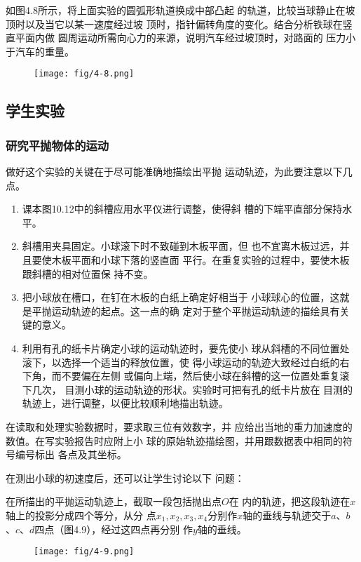 如图4.8所示，将上面实验的圆弧形轨道换成中部凸起
的轨道，比较当球静止在坡顶时以及当它以某一速度经过坡
顶时，指针偏转角度的变化。结合分析铁球在竖直平面内做
圆周运动所需向心力的来源，说明汽车经过坡顶时，对路面的
压力小于汽车的重量。


\begin{figure}[htp]
    \centering
    \texttt{[image: fig/4-8.png]}
    \caption{}
\end{figure}

\subsection{学生实验}
\subsubsection{研究平抛物体的运动}

做好这个实验的关键在于尽可能准确地描绘出平抛
运动轨迹，为此要注意以下几点。
\begin{enumerate}
\item 课本图10.12中的斜槽应用水平仪进行调整，使得斜
槽的下端平直部分保持水平。
\item 斜槽用夹具固定。小球滚下时不致碰到木板平面，但
也不宜离木板过远，并且要使木板平面和小球下落的竖直面
平行。在重复实验的过程中，要使木板跟斜槽的相对位置保
持不变。
\item 把小球放在槽口，在钉在木板的白纸上确定好相当于
小球球心的位置，这就是平抛运动轨迹的起点。这一点的确
定对于整个平抛运动轨迹的描绘具有关键的意义。
\item 利用有孔的纸卡片确定小球的运动轨迹时，要先使小
球从斜槽的不同位置处滚下，以选择一个适当的释放位置，使
得小球运动的轨迹大致经过白纸的右下角，而不要偏在左侧
或偏向上端，然后使小球在斜槽的这一位置处重复滚下几次，
目测小球的运动轨迹的形状。实验时可把有孔的纸卡片放在
目测的轨迹上，进行调整，以便比较顺利地描出轨迹。
\end{enumerate}

在读取和处理实验数据时，要求取三位有效数字，并
应给出当地的重力加速度的数值。在写实验报告时应附上小
球的原始轨迹描绘图，并用跟数据表中相同的符号编号标出
各点及其坐标。

在测出小球的初速度后，还可以让学生讨论以下
问题：

在所描出的平抛运动轨迹上，截取一段包括抛出点$O$在
内的轨迹，把这段轨迹在$x$轴上的投影分成四个等分，从分
点$x_1,x_2,x_3,x_4$分别作$x$轴的垂线与轨迹交于$a$、$b$、$c$、$d$四点（图4.9），经过这四点再分别
作$y$轴的垂线。
\begin{figure}[htp]
    \centering
    \texttt{[image: fig/4-9.png]}
    \caption{}
\end{figure}

